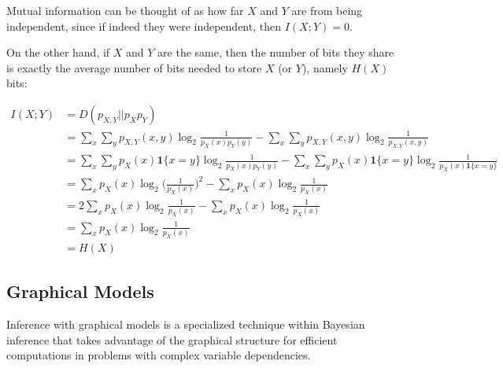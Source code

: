 Mutual information can be thought of as how far $X$ and $Y$ are from being independent, since if indeed they were independent, then $I(X; Y) = 0$.

On the other hand, if $X$ and $Y$ are the same, then the number of bits they share is exactly the average number of bits needed to store $X$ (or $Y$), namely $H(X)$ bits:

\begin{align*}
    I(X; Y) & = D(p_{X, Y} || p_X p_Y) \\
    & = \sum_x \sum_y p_{X, Y}(x, y) \log_2 \frac{1}{p_X(x) p_Y(y)} - \sum_x \sum_y p_{X, Y}(x, y) \log_2 \frac{1}{p_{X, Y}(x, y)} \\
    & = \sum_x \sum_y p_X(x) \mathbf{1}\{x = y\} \log_2 \frac{1}{p_X(x) p_Y(y)} - \sum_x \sum_y p_X(x) \mathbf{1}\{x = y\} \log_2 \frac{1}{p_X(x) \mathbf{1}\{x = y\}} \\
    & = \sum_x p_X(x) \log_2 \Big( \frac{1}{p_X(x)} \Big)^2 - \sum_x p_X(x) \log_2 \frac{1}{p_X(x)} \\
    & = 2 \sum_x p_X(x) \log_2 \frac{1}{p_X(x)} - \sum_x p_X(x) \log_2 \frac{1}{p_X(x)} \\
    & = \sum_x p_X(x) \log_2 \frac{1}{p_X(x)} \\
    & = H(X)
\end{align*}

\subsection{Graphical Models}

Inference with graphical models is a specialized technique within Bayesian inference that takes advantage of the graphical structure for efficient computations in problems with complex variable dependencies.

